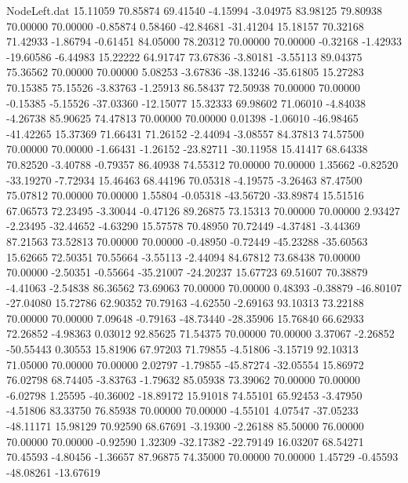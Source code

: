 \begin{filecontents}{NodeLeft.dat}
  15.11059   70.85874   69.41540    -4.15994   -3.04975   83.98125   79.80938   70.00000   70.00000   -0.85874    0.58460  -42.84681  -31.41204
  15.18157   70.32168   71.42933    -1.86794   -0.61451   84.05000   78.20312   70.00000   70.00000   -0.32168   -1.42933  -19.60586   -6.44983
  15.22222   64.91747   73.67836    -3.80181   -3.55113   89.04375   75.36562   70.00000   70.00000    5.08253   -3.67836  -38.13246  -35.61805
  15.27283   70.15385   75.15526    -3.83763   -1.25913   86.58437   72.50938   70.00000   70.00000   -0.15385   -5.15526  -37.03360  -12.15077
  15.32333   69.98602   71.06010    -4.84038   -4.26738   85.90625   74.47813   70.00000   70.00000    0.01398   -1.06010  -46.98465  -41.42265
  15.37369   71.66431   71.26152    -2.44094   -3.08557   84.37813   74.57500   70.00000   70.00000   -1.66431   -1.26152  -23.82711  -30.11958
  15.41417   68.64338   70.82520    -3.40788   -0.79357   86.40938   74.55312   70.00000   70.00000    1.35662   -0.82520  -33.19270   -7.72934
  15.46463   68.44196   70.05318    -4.19575   -3.26463   87.47500   75.07812   70.00000   70.00000    1.55804   -0.05318  -43.56720  -33.89874
  15.51516   67.06573   72.23495    -3.30044   -0.47126   89.26875   73.15313   70.00000   70.00000    2.93427   -2.23495  -32.44652   -4.63290
  15.57578   70.48950   70.72449    -4.37481   -3.44369   87.21563   73.52813   70.00000   70.00000   -0.48950   -0.72449  -45.23288  -35.60563
  15.62665   72.50351   70.55664    -3.55113   -2.44094   84.67812   73.68438   70.00000   70.00000   -2.50351   -0.55664  -35.21007  -24.20237
  15.67723   69.51607   70.38879    -4.41063   -2.54838   86.36562   73.69063   70.00000   70.00000    0.48393   -0.38879  -46.80107  -27.04080
  15.72786   62.90352   70.79163    -4.62550   -2.69163   93.10313   73.22188   70.00000   70.00000    7.09648   -0.79163  -48.73440  -28.35906
  15.76840   66.62933   72.26852    -4.98363    0.03012   92.85625   71.54375   70.00000   70.00000    3.37067   -2.26852  -50.55443    0.30553
  15.81906   67.97203   71.79855    -4.51806   -3.15719   92.10313   71.05000   70.00000   70.00000    2.02797   -1.79855  -45.87274  -32.05554
  15.86972   76.02798   68.74405    -3.83763   -1.79632   85.05938   73.39062   70.00000   70.00000   -6.02798    1.25595  -40.36002  -18.89172
  15.91018   74.55101   65.92453    -3.47950   -4.51806   83.33750   76.85938   70.00000   70.00000   -4.55101    4.07547  -37.05233  -48.11171
  15.98129   70.92590   68.67691    -3.19300   -2.26188   85.50000   76.00000   70.00000   70.00000   -0.92590    1.32309  -32.17382  -22.79149
  16.03207   68.54271   70.45593    -4.80456   -1.36657   87.96875   74.35000   70.00000   70.00000    1.45729   -0.45593  -48.08261  -13.67619

\end{filecontents}
